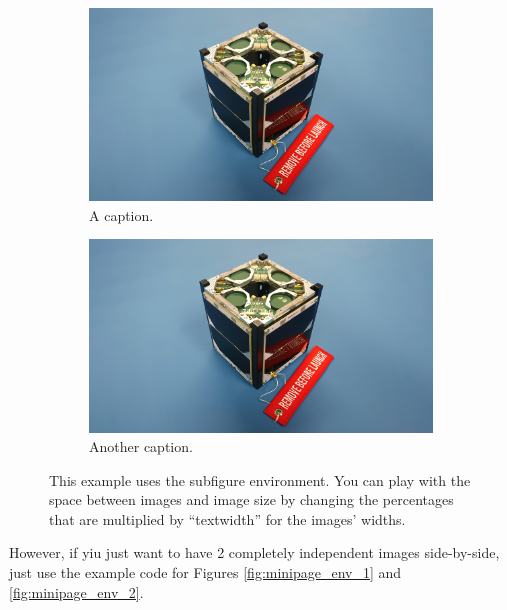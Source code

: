 \begin{figure}[!htb]
    \centering
    \begin{subfigure}{.4\textwidth}
        \centering
        \includegraphics[width=\textwidth]{images/istsat1.jpeg}
        \caption{A caption.}
    \end{subfigure}
    \hfill
    \begin{subfigure}{.4\textwidth}
        \centering
        \includegraphics[width=\textwidth]{images/istsat1.jpeg}
        \caption{Another caption.}
    \end{subfigure}
    \caption{This example uses the subfigure environment. You can play with the space between images and image size by changing the percentages that are multiplied by ``textwidth'' for the images' widths.}
	\label{fig:subfigure_env}
\end{figure}

However, if yiu just want to have 2 completely independent images side-by-side, just use the example code for Figures \ref{fig:minipage_env_1} and \ref{fig:minipage_env_2}.

